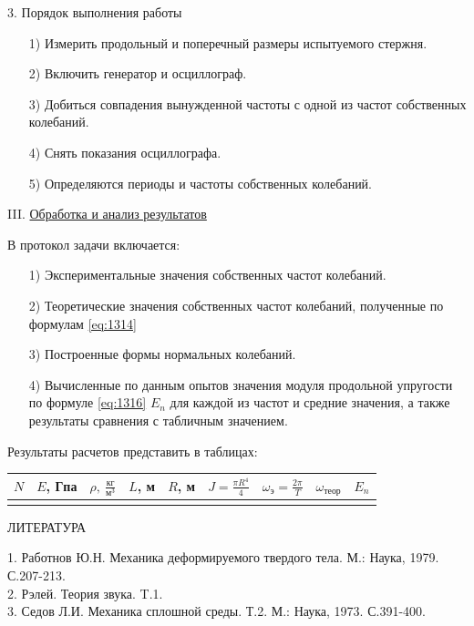 \documentclass[specialist, subf, href, colorlinks=true, 14pt, final]{disser}
\theoremstyle{definition}
\begin{document}
3. Порядок выполнения работы
\begin{enumerate}
  \item[1)] Измерить продольный и поперечный размеры испытуемого
стержня.
  \item[2)] Включить генератор и осциллограф.
  \item[3)] Добиться совпадения вынужденной частоты с одной из частот собственных колебаний.
  \item[4)] Снять показания осциллографа.
  \item[5)] Определяются периоды и частоты собственных колебаний.
\end{enumerate}


\noindent III. \underline{Обработка и анализ результатов}

В протокол задачи включается:
\begin{enumerate}
  \item[1)] Экспериментальные значения собственных частот колебаний.
  \item[2)] Теоретические значения собственных частот колебаний, 
полученные по формулам \eqref{eq:1314}
  \item[3)] Построенные формы нормальных колебаний.
  \item[4)] Вычисленные по данным опытов значения модуля продольной 
упругости по формуле \eqref{eq:1316} $E_n$ для каждой из частот и средние значения, а также результаты сравнения с табличным значением.
\end{enumerate}
Результаты расчетов представить в таблицах:
\begin{center}
{\large
\begin{tabular}{|c|c|c|c|c|c|c|c|c|}
  \hline
  $N$ & $E$, Гпа & $\rho,\ \frac{\text{кг}}{\text{м}^{3}}$ & $L$, м & $R$, м & $J = \frac{\pi R^{4}}{4}$ & $\omega_{\text{э}} = \frac{2\pi}{T}$ & $\omega_{\text{теор}}$ & $E_{n}$\\
  \hline
  & & & & & & & & \\
  \hline
\end{tabular}
}
\end{center}
\vspace{0.5cm}
\begin{center}
ЛИТЕРАТУРА
\end{center}
1. Работнов Ю.Н. Механика деформируемого твердого тела. М.: Наука, 1979. С.207-213.\\
2. Рэлей. Теория звука. T.1.\\
3. Седов Л.И. Механика сплошной среды. Т.2. М.: Наука, 1973.
С.391-400.
\end{document}

